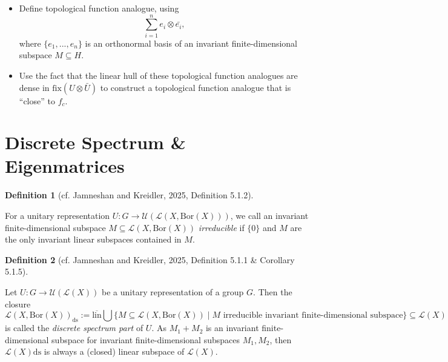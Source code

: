 \documentclass[
  british,
]{article}
\providecommand{\tightlist}{%
  \setlength{\itemsep}{0pt}\setlength{\parskip}{0pt}}
\theoremstyle{plain}
\theoremstyle{plain}
\theoremstyle{plain}
\theoremstyle{definition}
\newtheorem{definition}{Definition}[section]
\theoremstyle{remark}
\newcommand{\Borel}[1]{{\text{Bor}({#1})}}
\begin{document}
\begin{itemize}
\begin{itemize}
    \begin{itemize}
    \tightlist
    \item
      Or construct \(f_c\) such that this is the case.
    \item
      Or write \(f_c\) in terms of its orthonormal bases as it belongs
      to an irreducible invariant finite-dimensional subspace \(M\). If
      so, \(T^g\) would appear to be a matrix transformation \(A_g\) on
      \(M\) that preserves the inner product. The matrix coefficients
      will be defined by \((T^ge_i\mid e_j)\). \(A_g\) is a unitary
      matrix to conserve measures and \(g\mapsto A_g\) is a homomorphism
      mapping from \(G\) to a compact group of unitary matrices (prove).
    \end{itemize}
  \item
    Define topological function analogue, using \[
    \sum_{i=1}^ne_i\otimes\bar{e_i},
    \] where \(\{e_1,...,e_n\}\) is an orthonormal basis of an invariant
    finite-dimensional subspace \(M\subseteq H\).
  \item
    Use the fact that the linear hull of these topological function
    analogues are dense in \(\text{fix}(U\otimes\bar{U})\) to construct
    a topological function analogue that is ``close'' to \(f_c\).
  \end{itemize}
\end{itemize}

\section{Discrete Spectrum \&
Eigenmatrices}\label{discrete-spectrum-eigenmatrices}

\begin{definition}[{cf. Jamneshan and Kreidler, 2025, Definition
5.1.2}]\protect\hypertarget{def-Discrete-Spectrum}{}\label{def-Discrete-Spectrum}

For a unitary representation
\(U:G\rightarrow\mathscr{U}(\mathcal{L}(X,\Borel{X}))\), we call an
invariant finite-dimensional subspace
\(M\subseteq\mathcal{L}(X,\Borel{X})\) \emph{irreducible} if \(\{0\}\)
and \(M\) are the only invariant linear subspaces contained in \(M\).

\end{definition}

\begin{definition}[{cf. Jamneshan and Kreidler, 2025, Definition 5.1.1
\& Corollary
5.1.5}]\protect\hypertarget{def-Discrete-Spectrum}{}\label{def-Discrete-Spectrum}

Let \(U:G\rightarrow\mathscr{U}(\mathcal{L}(X))\) be a unitary
representation of a group \(G\). Then the closure \[
\mathcal{L}(X,\Borel{X})_\text{ds}:=\overline{\text{lin}}\bigcup\{M\subseteq \mathcal{L}(X,\Borel{X})\mid M\text{ irreducible invariant finite-dimensional subspace}\}\subseteq \mathcal{L}(X)
\] is called the \emph{discrete spectrum part} of \(U\). As \(M_1+M_2\)
is an invariant finite-dimensional subspace for invariant
finite-dimensional subspaces \(M_1,M_2\), then
\(\mathcal{L}(X)\text{ds}\) is always a (closed) linear subspace of
\(\mathcal{L}(X)\).

\end{definition}
\end{document}
